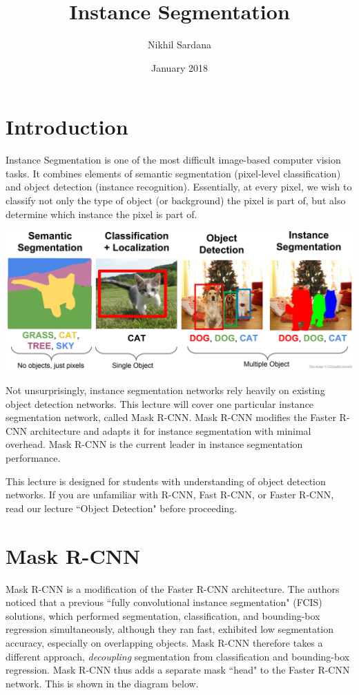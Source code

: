 \documentclass{article}
\title{Instance Segmentation}
\author{Nikhil Sardana}
\date{January 2018}
\begin{document}
\maketitle

\section{Introduction}

Instance Segmentation is one of the most difficult image-based computer vision tasks. It combines elements of semantic segmentation (pixel-level classification) and object detection (instance recognition). Essentially, at every pixel, we wish to classify not only the type of object (or background) the pixel is part of, but also determine which instance the pixel is part of.

\begin{center}
\includegraphics[scale=0.3]{tasks.PNG}
\end{center}

Not unsurprisingly, instance segmentation networks rely heavily on existing object detection networks. This lecture will cover one particular instance segmentation network, called Mask R-CNN. Mask R-CNN modifies the Faster R-CNN architecture and adapts it for instance segmentation with minimal overhead. Mask R-CNN is the current leader in instance segmentation performance.

This lecture is designed for students with understanding of object detection networks. If you are unfamiliar with R-CNN, Fast R-CNN, or Faster R-CNN, read our lecture ``Object Detection" before proceeding.

\section{Mask R-CNN}
Mask R-CNN is a modification of the Faster R-CNN architecture. The authors noticed that a previous ``fully convolutional instance segmentation" (FCIS) solutions, which performed segmentation, classification, and bounding-box regression simultaneously, although they ran fast, exhibited low segmentation accuracy, especially on overlapping objects. Mask R-CNN therefore takes a different approach, \textit{decoupling} segmentation from classification and bounding-box regression. Mask R-CNN thus adds a separate mask ``head" to the Faster R-CNN network. This is shown in the diagram below.
\end{document}
